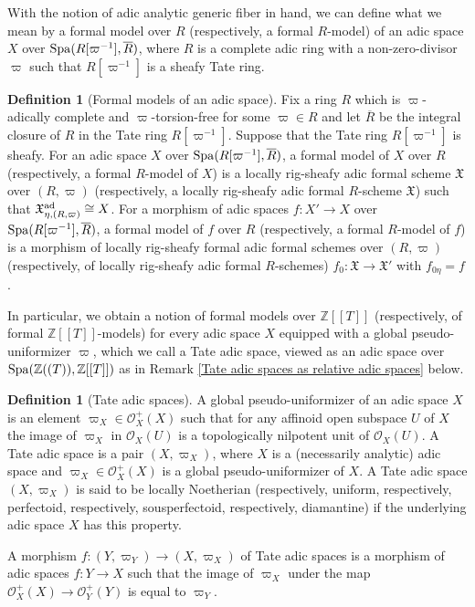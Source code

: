 \documentclass[12pt,twoside,a4paper]{article}
\theoremstyle{definition}
\newtheorem{mydef}[thm]{Definition}
\theoremstyle{remark}
\newcommand\ad{{\rm ad}}
\newcommand\Spa{{\rm Spa}}
\begin{document}
With the notion of adic analytic generic fiber in hand, we can define what we mean by a formal model over $R$ (respectively, a formal $R$-model) of an adic space $X$ over $\Spa(R[\varpi^{-1}], \overline{R})$, where $R$ is a complete adic ring with a non-zero-divisor $\varpi$ such that $R[\varpi^{-1}]$ is a sheafy Tate ring. 
\begin{mydef}[Formal models of an adic space]\label{Definition of formal models}Fix a ring $R$ which is $\varpi$-adically complete and $\varpi$-torsion-free for some $\varpi\in R$ and let $\overline{R}$ be the integral closure of $R$ in the Tate ring $R[\varpi^{-1}]$. Suppose that the Tate ring $R[\varpi^{-1}]$ is sheafy. For an adic space $X$ over $\Spa(R[\varpi^{-1}], \overline{R})$, a formal model of $X$ over $R$ (respectively, a formal $R$-model of $X$) is a locally rig-sheafy adic formal scheme $\mathfrak{X}$ over $(R, \varpi)$ (respectively, a locally rig-sheafy adic formal $R$-scheme $\mathfrak{X}$) such that $\mathfrak{X}_{\eta, (R, \varpi)}^{\ad}\cong X$. For a morphism of adic spaces $f: X'\to X$ over $\Spa(R[\varpi^{-1}], \overline{R})$, a formal model of $f$ over $R$ (respectively, a formal $R$-model of $f$) is a morphism of locally rig-sheafy formal adic formal schemes over $(R, \varpi)$ (respectively, of locally rig-sheafy adic formal $R$-schemes) $f_{0}: \mathfrak{X}\to\mathfrak{X}'$ with $f_{0\eta}=f$.  \end{mydef}
In particular, we obtain a notion of formal models over $\mathbb{Z}[[T]]$ (respectively, of formal $\mathbb{Z}[[T]]$-models) for every adic space $X$ equipped with a global pseudo-uniformizer $\varpi$, which we call a Tate adic space, viewed as an adic space over $\Spa(\mathbb{Z}((T)), \mathbb{Z}[[T]])$ as in Remark \ref{Tate adic spaces as relative adic spaces} below. 
\begin{mydef}[Tate adic spaces]\label{Tate adic spaces}A global pseudo-uniformizer of an adic space $X$ is an element $\varpi_{X}\in \mathcal{O}_{X}^{+}(X)$ such that for any affinoid open subspace $U$ of $X$ the image of $\varpi_{X}$ in $\mathcal{O}_{X}(U)$ is a topologically nilpotent unit of $\mathcal{O}_{X}(U)$. A Tate adic space is a pair $(X, \varpi_{X})$, where $X$ is a (necessarily analytic) adic space and $\varpi_{X}\in \mathcal{O}_{X}^{+}(X)$ is a global pseudo-uniformizer of $X$. A Tate adic space $(X, \varpi_{X})$ is said to be locally Noetherian (respectively, uniform, respectively, perfectoid, respectively, sousperfectoid, respectively, diamantine) if the underlying adic space $X$ has this property. 

A morphism $f: (Y, \varpi_{Y})\to (X, \varpi_{X})$ of Tate adic spaces is a morphism of adic spaces $f: Y\to X$ such that the image of $\varpi_{X}$ under the map $\mathcal{O}_{X}^{+}(X)\to \mathcal{O}_{Y}^{+}(Y)$ is equal to $\varpi_{Y}$.\end{mydef}
\end{document}
